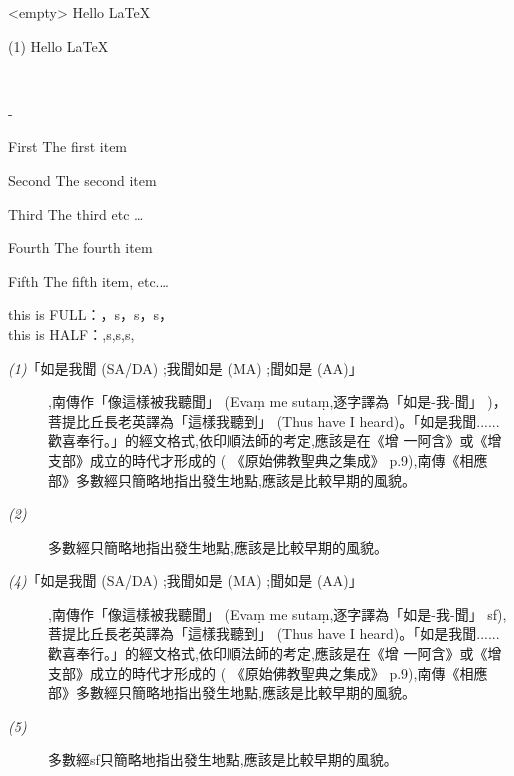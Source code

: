 \documentclass[12pt,a4paper]{book}
\newenvironment{Description}
{\list{} {\labelwidth=0pt \itemindent-\leftmargin \let\makelabel\Descriptionlabel \itshape}}
{\endlist}
\newcommand*\Descriptionlabel[1]{\hspace \labelsep  \normalfont \color{blue} \bfseries \sffamily #1}
\newcommand{\subnote}[3][]{
  \ifthenelse{\isempty{#1}}
  {\item[#2] <empty> #3}
  {\item[#2] #1 #3}
}
\newenvironment{EnvNote}{\begin{description}
}{\end{description}}
\begin{document}
  \begin{EnvNote}
    \subnote[(1)]{hehe}{ Hello \LaTeX} \\
  \end{EnvNote}



\begin{Description}
  \item[First] The first item
  \item[Second] The second item
  \item[Third] The third etc \ldots
  \item[Fourth]{The fourth item}
  \item[Fifth]{The fifth item, etc.\ldots}
\end{Description}

this is FULL：，s，s，s，
\\
this is HALF：,s,s,s,

\begin{description}
  \item[\textit{(1)}「如是我聞 (SA/DA) ;我聞如是 (MA) ;聞如是 (AA)」],南傳作「像這樣被我聽聞」 (Evaṃ
me sutaṃ,逐字譯為「如是-我-聞」 )，菩提比丘長老英譯為「這樣我聽到」 (Thus have
I heard)。「如是我聞......歡喜奉行。」的經文格式,依印順法師的考定,應該是在《增
一阿含》或《增支部》成立的時代才形成的 ( 《原始佛教聖典之集成》 p.9),南傳《相應
部》多數經只簡略地指出發生地點,應該是比較早期的風貌。
  \item[\textit{(2)}] 多數經只簡略地指出發生地點,應該是比較早期的風貌。
\end{description}

\begin{description}
  \item[\textit{(4)}「如是我聞 (SA/DA) ;我聞如是 (MA) ;聞如是 (AA)」],南傳作「像這樣被我聽聞」 (Evaṃ
me sutaṃ,逐字譯為「如是-我-聞」 sf),菩提比丘長老英譯為「這樣我聽到」 (Thus have
I heard)。「如是我聞......歡喜奉行。」的經文格式,依印順法師的考定,應該是在《增
一阿含》或《增支部》成立的時代才形成的 ( 《原始佛教聖典之集成》 p.9),南傳《相應
部》多數經只簡略地指出發生地點,應該是比較早期的風貌。
  \item[\textit{(5)}] 多數經sf只簡略地指出發生地點,應該是比較早期的風貌。
\end{description}
\end{document}
